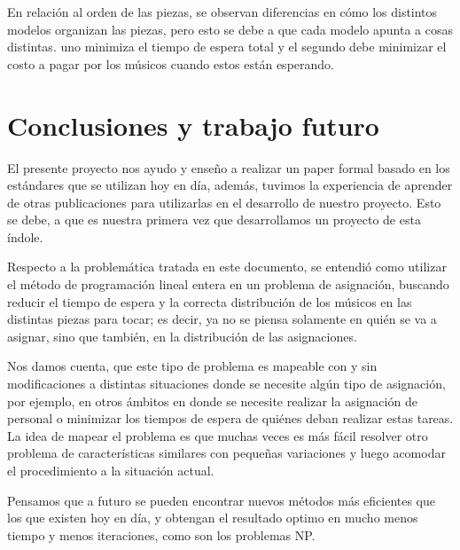 \documentclass[journal, 10pt]{IEEEtran}
\begin{document}
	En relación al orden de las piezas, se observan diferencias en cómo los distintos modelos organizan las piezas, pero esto se debe a que cada modelo apunta a cosas distintas. uno minimiza el tiempo de espera total y el segundo debe minimizar el costo a pagar por los músicos cuando estos están esperando.


\section{Conclusiones y trabajo futuro}

El presente proyecto nos ayudo y enseño a realizar un paper formal basado en los estándares que se utilizan hoy en día, además, tuvimos la experiencia de aprender de otras publicaciones para utilizarlas en el desarrollo de nuestro proyecto. Esto se debe, a que es nuestra primera vez que desarrollamos un proyecto de esta índole.

Respecto a la problemática tratada en este documento, se entendió como utilizar el método de programación lineal entera en un problema de asignación, buscando reducir el tiempo de espera y la correcta distribución de los músicos en las distintas piezas para tocar; es decir, ya no se piensa solamente en quién se va a asignar, sino que también, en la distribución de las asignaciones.

Nos damos cuenta, que este tipo de problema es mapeable con y sin modificaciones a distintas situaciones donde se necesite algún tipo de asignación, por ejemplo, en otros ámbitos en donde se necesite realizar la asignación de personal o minimizar los tiempos de espera de quiénes deban realizar estas tareas. La idea de mapear el problema es que muchas veces es más fácil resolver otro problema de características similares con pequeñas variaciones y luego acomodar el procedimiento a la situación actual.

Pensamos que a futuro se pueden encontrar nuevos métodos más eficientes que los que existen hoy en día, y obtengan el resultado optimo en mucho menos tiempo y menos iteraciones, como son los problemas NP.




\end{document}

